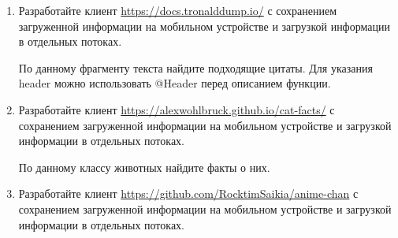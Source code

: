 \begin{enumerate}
	\item Разработайте клиент \url{https://docs.tronalddump.io/} с сохранением загруженной информации на мобильном устройстве и загрузкой
		информации в отдельных потоках. 

		По данному фрагменту текста найдите подходящие цитаты. Для указания header можно использовать @Header перед описанием функции.

	\item Разработайте клиент \url{https://alexwohlbruck.github.io/cat-facts/} с сохранением загруженной информации на мобильном устройстве и загрузкой
		информации в отдельных потоках. 

		По данному классу животных найдите факты о них.

	\item Разработайте клиент \url{https://github.com/RocktimSaikia/anime-chan} с сохранением загруженной информации на мобильном устройстве и загрузкой
		информации в отдельных потоках. 


\end{enumerate}
